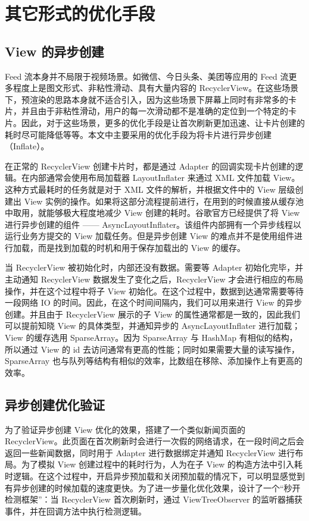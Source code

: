 \chapter{其它形式的优化手段}

\section{View 的异步创建}

Feed 流本身并不局限于视频场景。如微信、今日头条、美团等应用的 Feed 流更多程度上是图文形式、非粘性滑动、具有大量内容的 RecyclerView。在这些场景下，预渲染的思路本身就不适合引入，因为这些场景下屏幕上同时有非常多的卡片，并且由于非粘性滑动，用户的每一次滑动都不是准确的定位到一个特定的卡片。因此，对于这些场景，更多的优化手段是让首次刷新更加迅速、让卡片创建的耗时尽可能降低等等。本文中主要采用的优化手段为将卡片进行异步创建（Inflate）。

在正常的 RecyclerView 创建卡片时，都是通过 Adapter 的回调实现卡片创建的逻辑。在内部通常会使用布局加载器 LayoutInflater 来通过 XML 文件加载 View。这种方式最耗时的任务就是对于 XML 文件的解析，并根据文件中的 View 层级创建出 View 实例的操作。如果将这部分流程提前进行，在用到的时候直接从缓存池中取用，就能够极大程度地减少 View 创建的耗时。谷歌官方已经提供了将 View 进行异步创建的组件 —— AsyncLayoutInflater。该组件内部拥有一个异步线程以运行业务方提交的 View 加载任务。但是异步创建 View 的难点并不是使用组件进行加载，而是找到加载的时机和用于保存加载出的 View 的缓存。

当 RecyclerView 被初始化时，内部还没有数据。需要等 Adapter 初始化完毕，并主动通知 RecyclerView 数据发生了变化之后，RecyclerView 才会进行相应的布局操作，并在这个过程中将子 View 初始化。在这个过程中，数据到达通常需要等待一段网络 IO 的时间。因此，在这个时间间隔内，我们可以用来进行 View 的异步创建。并且由于 RecyclerView 展示的子 View 的属性通常都是一致的，因此我们可以提前知晓 View 的具体类型，并通知异步的 AsyncLayoutInflater 进行加载；View 的缓存选用 SparseArray。因为 SparseArray 与 HashMap 有相似的结构，所以通过 View 的 id 去访问通常有更高的性能；同时如果需要大量的读写操作，SparseArray 也与队列等结构有相似的效率，比数组在移除、添加操作上有更高的效率。

\section{异步创建优化验证}

为了验证异步创建 View 优化的效果，搭建了一个类似新闻页面的 RecyclerView。此页面在首次刷新时会进行一次假的网络请求，在一段时间之后会返回一些新闻数据，同时用于 Adapter 进行数据绑定并通知 RecyclerView 进行布局。为了模拟 View 创建过程中的耗时行为，人为在子 View 的构造方法中引入耗时逻辑。在这个过程中，开启异步预加载和关闭预加载的情况下，可以明显感觉到有异步创建的时候加载的速度更快。为了进一步量化优化效果，设计了一个“秒开检测框架”：当 RecyclerView 首次刷新时，通过 ViewTreeObserver 的监听器捕获事件，并在回调方法中执行检测逻辑。

